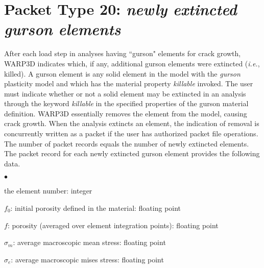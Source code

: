 \documentclass[10pt]{report}
\numberwithin{equation}{section}
\newcommand{\ie}{\ti{i.e.},\xspace}
\newcommand{\ti}{\emph}
\newcommand{\squishlist}{
 \begin{list}{$\bullet$}
  { \setlength{\itemsep}{0pt}
     \setlength{\parsep}{3pt}
     \setlength{\topsep}{3pt}
     \setlength{\partopsep}{0pt}
     \setlength{\leftmargin}{1.5em}
     \setlength{\labelwidth}{1em}
     \setlength{\labelsep}{0.5em} } }
\newcommand{\squishend}{
  \end{list}  }
\begin{document}
%
%
\section{Packet Type 20: \ti{newly extincted gurson elements}}
After each load step in analyses having ``gurson" elements 
for crack growth, WARP3D indicates which, if any, additional gurson elements 
were extincted (\ie killed). A gurson element is any solid element
in the model with the \ti{gurson} plasticity model and which has the 
material property \ti{killable} invoked. The user must indicate whether or not
a solid element may be extincted in an analysis through the keyword
\ti{killable} in the specified
properties of the gurson material definition.
WARP3D essentially removes the element from the model, 
causing crack growth. When the analysis extincts an element, the indication of 
removal is concurrently written as a packet if the user has authorized packet 
file operations. The number of packet records equals the number 
of newly extincted elements.
The packet record for each newly extincted gurson 
element provides the following data.
\squishlist
\item the element number:  integer
\item $f_0$:  initial porosity defined in the material:  floating point
\item $f$:  porosity (averaged over element integration points):  floating point
\item $\sigma_m$: average macroscopic mean stress:  floating point
\item $\sigma_e$:  average macroscopic mises stress:  floating point
\squishend

%
%
\end{document}
